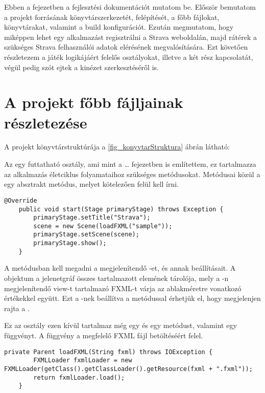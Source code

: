 Ebben a fejezetben a fejlesztési dokumentációt mutatom be.
Először bemutatom a projekt forrásának könyvtárszerkezetét, felépítését, a főbb fájlokat, könyvtárakat, valamint a build konfigurációt.
Ezután megmutatom, hogy miképpen lehet egy alkalmazást regisztrálni a Strava weboldalán, majd rátérek  a szükséges Strava felhasználói adatok elérésének megvalósítására.
Ezt követően részletezem a játék logikájáért felelős osztályokat, illetve a két rész kapcsolatát, végül pedig szót ejtek a kinézet szerkesztéséről is.

\section{A projekt főbb fájljainak részletezése}


A projekt könyvtárstruktúrája a \ref{fig_konyvtarStruktura} ábrán látható:


Az  egy futtatható osztály, ami mint a … fejezetben is említettem, ez tartalmazza az alkalmazás életciklus folyamataihoz szükséges metódusokat.
Metódusai közül a  egy absztrakt metódus, melyet kötelezően felül kell írni.


\begin{verbatim}
@Override
    public void start(Stage primaryStage) throws Exception {
        primaryStage.setTitle("Strava");
        scene = new Scene(loadFXML("sample"));
        primaryStage.setScene(scene);
        primaryStage.show();
    }
\end{verbatim}
 
A  metódusban kell megadni a megjelenítendő -et, és annak beállításait.
A  objektum a jelenetgráf összes tartalmazott elemének tárolója, mely a -n megjelenítendő view-t tartalmazó FXML-t várja az ablakméretre vonatkozó értékekkel együtt.
Ezt a -nek beállítva a  metódussal érhetjük el, hogy megjelenjen rajta a .

Ez az osztály ezen kívül tartalmaz még egy  és egy  metódust, valamint egy  függvényt.
A  függvény a megfelelő FXML fájl betöltéséért felel.

\begin{verbatim}
private Parent loadFXML(String fxml) throws IOException {
        FXMLLoader fxmlLoader = new FXMLLoader(getClass().getClassLoader().getResource(fxml + ".fxml"));
        return fxmlLoader.load();
    } 
\end{verbatim}
 
